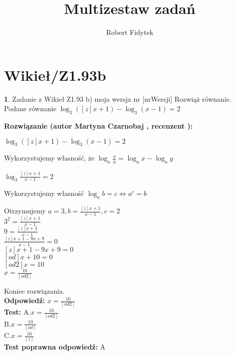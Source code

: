 \documentclass[12pt, a4paper]{article}
\title{Multizestaw zadań}
\author{Robert Fidytek}
\date{}
\theoremstyle{definition} %
\newtheorem{zad}{}
\newcommand{\kategoria}[1]{\section{#1}} %
\newcommand{\zadStart}[1]{\begin{zad}#1\newline} %
\newcommand{\zadStop}{\end{zad}}   %
\newcommand{\rozwStart}[2]{\noindent \textbf{Rozwiązanie (autor #1 , recenzent #2): }\newline} %
\newcommand{\rozwStop}{\newline}                                            %
\newcommand{\odpStart}{\noindent \textbf{Odpowiedź:}\newline}    %
\newcommand{\odpStop}{\newline}                                             %
\newcommand{\testStart}{\noindent \textbf{Test:}\newline} %
\newcommand{\testStop}{\newline} %
\newcommand{\kluczStart}{\noindent \textbf{Test poprawna odpowiedź:}\newline} %
\newcommand{\kluczStop}{\newline} %
\begin{document}
\maketitle


\kategoria{Wikieł/Z1.93b}
\zadStart{Zadanie z Wikieł Z1.93 b) moja wersja nr [nrWersji]}
Rozwiąż równanie.\\
Podane równanie $ \log_3 ([z]x + 1) - \log_3 (x-1) = 2 $\\
\zadStop
\rozwStart{Martyna Czarnobaj}{}
\begin{center}
	$ \log_3 ([z]x + 1) - \log_3 (x-1) = 2 $\\
\end{center}
	Wykorzystujemy własność, że $ \log_a \frac{x}{y} = \log_a x - \log_a y $\\
\begin{center}
	$ \log_3 \frac{[z]x + 1}{x - 1} = 2 $\\
\end{center}
	Wykorzystujemy własność $ \log_a b = c \iff a^{c} = b $\\
\begin{center}
	Otrzymujemy $ a = 3, b = \frac{[z]x + 1}{x - 1}, c = 2 $\\
	$ 3^{2} = \frac{[z]x + 1}{x - 1} $\\
	$ 9 = \frac{[z]x + 1}{x - 1} $\\
	$ \frac{[z]x + 1 - 9x + 9}{x - 1} = 0 $\\
	$ [z]x + 1 - 9x + 9 = 0 $\\
	$ [od]x + 10 = 0$\\
	$ [od2]x=10 $\\
	$ x=\frac{10}{[od2]} $\\
	 
\end{center}
Koniec rozwiązania.\\
\rozwStop
\odpStart
$ x=\frac{10}{[od2]} $\\
\odpStop
\testStart
A.$ x=\frac{10}{[od2]} $\\
B.$ x=\frac{10}{[od]} $\\
C.$ x=\frac{10}{[z]} $\\
\testStop
\kluczStart
A
\kluczStop
\end{document}
